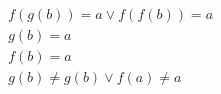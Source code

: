 \begin{align*}
%
& f(g(b)) = a \lor f(f(b)) = a
~\\~
& g(b) = a
~\\~
& f(b) = a
~\\~
& g(b)  \neq  g(b) \lor f(a)  \neq  a
%
\end{align*}
